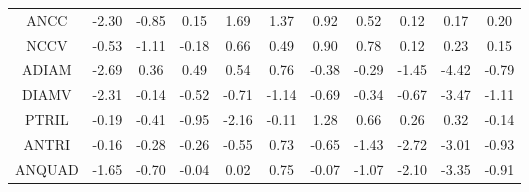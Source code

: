 \begin{longtable}{ | c || c | c | c | c | c | c | c | c | c || c |}
ANCC &  \cellcolor[HTML]{FFC7C7} -2.30 &  \cellcolor[HTML]{FFE7E7} -0.85 &  \cellcolor[HTML]{FFFFFF} 0.15 &  \cellcolor[HTML]{D7D7FF} 1.69 &  \cellcolor[HTML]{DFDFFF} 1.37 &  \cellcolor[HTML]{E7E7FF} 0.92 &  \cellcolor[HTML]{EFEFFF} 0.52 &  \cellcolor[HTML]{FFFFFF} 0.12 &  \cellcolor[HTML]{F7F7FF} 0.17 &  \cellcolor[HTML]{F7F7FF} 0.20 \\
NCCV &  \cellcolor[HTML]{FFEFEF} -0.53 &  \cellcolor[HTML]{FFE7E7} -1.11 &  \cellcolor[HTML]{FFF7F7} -0.18 &  \cellcolor[HTML]{EFEFFF} 0.66 &  \cellcolor[HTML]{EFEFFF} 0.49 &  \cellcolor[HTML]{E7E7FF} 0.90 &  \cellcolor[HTML]{EFEFFF} 0.78 &  \cellcolor[HTML]{FFFFFF} 0.12 &  \cellcolor[HTML]{F7F7FF} 0.23 &  \cellcolor[HTML]{FFFFFF} 0.15 \\
ADIAM &  \cellcolor[HTML]{FFBFBF} -2.69 &  \cellcolor[HTML]{F7F7FF} 0.36 &  \cellcolor[HTML]{EFEFFF} 0.49 &  \cellcolor[HTML]{EFEFFF} 0.54 &  \cellcolor[HTML]{EFEFFF} 0.76 &  \cellcolor[HTML]{FFF7F7} -0.38 &  \cellcolor[HTML]{FFF7F7} -0.29 &  \cellcolor[HTML]{FFD7D7} -1.45 &  \cellcolor[HTML]{FF8F8F} -4.42 &  \cellcolor[HTML]{FFEFEF} -0.79 \\
DIAMV &  \cellcolor[HTML]{FFC7C7} -2.31 &  \cellcolor[HTML]{FFFFFF} -0.14 &  \cellcolor[HTML]{FFEFEF} -0.52 &  \cellcolor[HTML]{FFEFEF} -0.71 &  \cellcolor[HTML]{FFDFDF} -1.14 &  \cellcolor[HTML]{FFEFEF} -0.69 &  \cellcolor[HTML]{FFF7F7} -0.34 &  \cellcolor[HTML]{FFEFEF} -0.67 &  \cellcolor[HTML]{FFA7A7} -3.47 &  \cellcolor[HTML]{FFE7E7} -1.11 \\
PTRIL &  \cellcolor[HTML]{FFF7F7} -0.19 &  \cellcolor[HTML]{FFF7F7} -0.41 &  \cellcolor[HTML]{FFE7E7} -0.95 &  \cellcolor[HTML]{FFC7C7} -2.16 &  \cellcolor[HTML]{FFFFFF} -0.11 &  \cellcolor[HTML]{DFDFFF} 1.28 &  \cellcolor[HTML]{EFEFFF} 0.66 &  \cellcolor[HTML]{F7F7FF} 0.26 &  \cellcolor[HTML]{F7F7FF} 0.32 &  \cellcolor[HTML]{FFFFFF} -0.14 \\
ANTRI &  \cellcolor[HTML]{FFF7F7} -0.16 &  \cellcolor[HTML]{FFF7F7} -0.28 &  \cellcolor[HTML]{FFF7F7} -0.26 &  \cellcolor[HTML]{FFEFEF} -0.55 &  \cellcolor[HTML]{EFEFFF} 0.73 &  \cellcolor[HTML]{FFEFEF} -0.65 &  \cellcolor[HTML]{FFDFDF} -1.43 &  \cellcolor[HTML]{FFB7B7} -2.72 &  \cellcolor[HTML]{FFB7B7} -3.01 &  \cellcolor[HTML]{FFE7E7} -0.93 \\
ANQUAD &  \cellcolor[HTML]{FFD7D7} -1.65 &  \cellcolor[HTML]{FFEFEF} -0.70 &  \cellcolor[HTML]{FFFFFF} -0.04 &  \cellcolor[HTML]{FFFFFF} 0.02 &  \cellcolor[HTML]{EFEFFF} 0.75 &  \cellcolor[HTML]{FFFFFF} -0.07 &  \cellcolor[HTML]{FFE7E7} -1.07 &  \cellcolor[HTML]{FFC7C7} -2.10 &  \cellcolor[HTML]{FFA7A7} -3.35 &  \cellcolor[HTML]{FFE7E7} -0.91 \\

\end{longtable}
